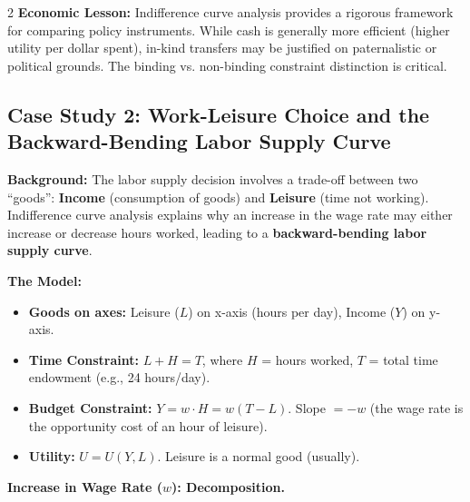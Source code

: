 \documentclass[10pt,a4paper]{article}
\begin{document}
\begin{multicols}{2}
\textbf{Economic Lesson:} Indifference curve analysis provides a rigorous framework for comparing policy instruments. While cash is generally more efficient (higher utility per dollar spent), in-kind transfers may be justified on paternalistic or political grounds. The binding vs. non-binding constraint distinction is critical.

\subsection*{Case Study 2: Work-Leisure Choice and the Backward-Bending Labor Supply Curve}

\textbf{Background:} The labor supply decision involves a trade-off between two ``goods'': \textbf{Income} (consumption of goods) and \textbf{Leisure} (time not working). Indifference curve analysis explains why an increase in the wage rate may either increase or decrease hours worked, leading to a \textbf{backward-bending labor supply curve}.

\textbf{The Model:}
\begin{itemize}[leftmargin=*,nosep]
    \item \textbf{Goods on axes:} Leisure ($L$) on x-axis (hours per day), Income ($Y$) on y-axis.
    \item \textbf{Time Constraint:} $L + H = T$, where $H$ = hours worked, $T$ = total time endowment (e.g., 24 hours/day).
    \item \textbf{Budget Constraint:} $Y = w \cdot H = w (T - L)$. Slope $= -w$ (the wage rate is the opportunity cost of an hour of leisure).
    \item \textbf{Utility:} $U = U(Y, L)$. Leisure is a normal good (usually).
\end{itemize}

\textbf{Increase in Wage Rate ($w$): Decomposition.}
\begin{center}
\end{center}


\end{multicols}
\end{document}
